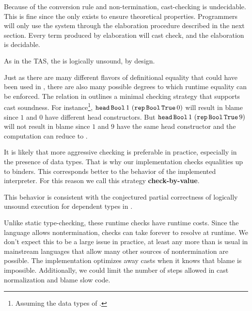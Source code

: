 
 
Because of the conversion rule and non-termination, cast-checking is undecidable.
This is fine since the \csys{} only exists to ensure theoretical properties. 
Programmers will only use the system through the elaboration procedure described in the next section.
Every term produced by elaboration will cast check, and the elaboration is decidable. %
 
As in the \slang{}\ac{TAS}, the \clang{} is logically unsound, by design.
 
Just as there are many different flavors of definitional equality that could have been used in , there are also many possible degrees to which runtime equality can be enforced.
The \Blame{} relation in  outlines a minimal checking strategy that supports cast soundness.
For instance\footnote{
  Assuming the data types of .
}, $\mathtt{head}\,\mathtt{Bool}{}\,1\,\left(\mathtt{rep}\,\mathtt{Bool}{}\,\mathtt{True}{}\,0\right)$ will result in blame since $1$ and $0$ have different head constructors.
But $\mathtt{head}\,\mathtt{Bool}{}\,1\,\left(\mathtt{rep}\,\mathtt{Bool}{}\,\mathtt{True}{}\,9\right)$ will not result in blame since $1$ and $9$ have the same head constructor and the computation can reduce to \True{}.
 
It is likely that more aggressive checking is preferable in practice, especially in the presence of data types.
That is why our implementation checks equalities up to binders. 
This corresponds better to the \cbv{} behavior of the implemented interpreter.
For this reason we call this strategy \textbf{check-by-value}.
 
This behavior is consistent with the conjectured partial correctness of logically unsound \cbv{} execution for dependent types in \cite{jia2010dependent}.
 
 
Unlike static type-checking, these runtime checks have runtime costs.
Since the language allows nontermination, checks can take forever to resolve at runtime.
We don't expect this to be a large issue in practice, at least any more than is usual in mainstream languages that allow many other sources of nontermination are possible.
The implementation optimizes away casts when it knows that blame is impossible.
Additionally, we could limit the number of steps allowed in cast normalization and blame slow code.